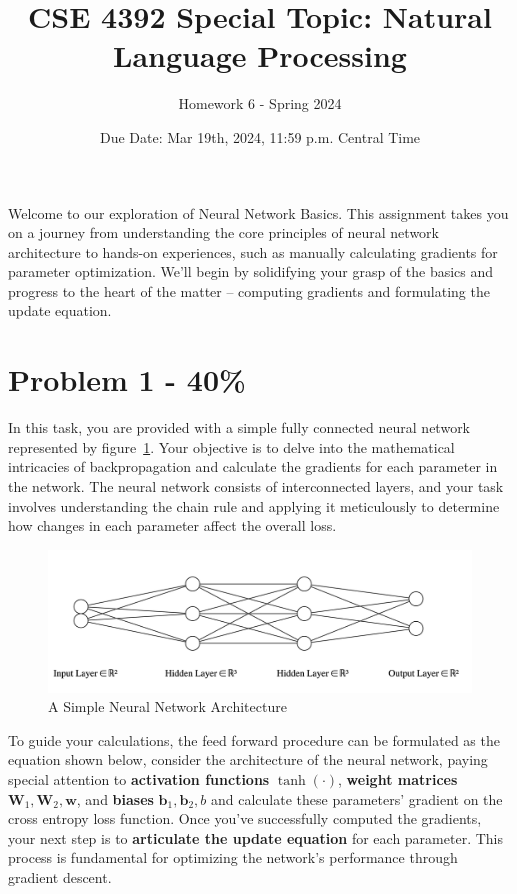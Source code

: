 \documentclass{article}
\begin{document}
\title{CSE 4392 Special Topic: Natural Language Processing}
\author{Homework 6 - Spring 2024}
\date{Due Date: Mar 19th, 2024, 11:59 p.m. Central Time}
\maketitle
\thispagestyle{fancy}


Welcome to our exploration of Neural Network Basics. This assignment takes you on a journey from understanding the core principles of neural network architecture to hands-on experiences, such as manually calculating gradients for parameter optimization. We'll begin by solidifying your grasp of the basics and progress to the heart of the matter – computing gradients and formulating the update equation.

\section*{Problem 1 - 40\%}
In this task, you are provided with a simple fully connected neural network represented by figure~\ref*{fig:nn}. Your objective is to delve into the mathematical intricacies of backpropagation and calculate the gradients for each parameter in the network. The neural network consists of interconnected layers, and your task involves understanding the chain rule and applying it meticulously to determine how changes in each parameter affect the overall loss.
\begin{figure}[h]
    \centering
    \includegraphics[width=1\textwidth]{hw6nn.png}
    \caption{A Simple Neural Network Architecture}
    \label{fig:nn}
\end{figure}
\newline
To guide your calculations, the feed forward procedure can be formulated as the equation shown below, consider the architecture of the neural network, paying special attention to \textbf{activation functions} $\tanh(\cdot)$, \textbf{weight matrices} $\mathbf{W}_{1}, \mathbf{W}_{2}, \mathbf{w}$, and \textbf{biases} $\mathbf{b}_{1}, \mathbf{b}_{2}, b$ and calculate these parameters' gradient on the cross entropy loss function. Once you've successfully computed the gradients, your next step is to \textbf{articulate the update equation} for each parameter. This process is fundamental for optimizing the network's performance through gradient descent.
\end{document}
